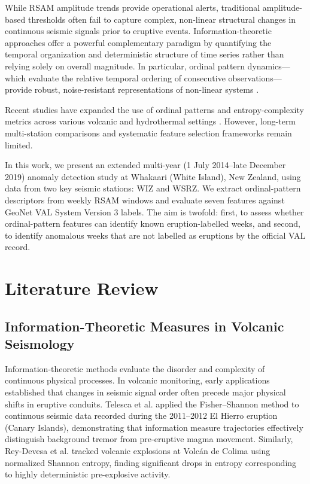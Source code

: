 \documentclass[journal]{IEEEtran}
\begin{document}
While RSAM amplitude trends provide operational alerts, traditional amplitude-based thresholds often fail to capture complex, non-linear structural changes in continuous seismic signals prior to eruptive events. Information-theoretic approaches offer a powerful complementary paradigm by quantifying the temporal organization and deterministic structure of time series rather than relying solely on overall magnitude. In particular, ordinal pattern dynamics—which evaluate the relative temporal ordering of consecutive observations—provide robust, noise-resistant representations of non-linear systems \cite{bandt2002permutation}.

Recent studies have expanded the use of ordinal patterns and entropy-complexity metrics across various volcanic and hydrothermal settings \cite{telesca2014using, rey2023tracking, sudibyo2022eruption}. However, long-term multi-station comparisons and systematic feature selection frameworks remain limited. 

In this work, we present an extended multi-year (1 July 2014--late December 2019) anomaly detection study at Whakaari (White Island), New Zealand, using data from two key seismic stations: WIZ and WSRZ. We extract ordinal-pattern descriptors from weekly RSAM windows and evaluate seven features against GeoNet VAL System Version 3 labels. The aim is twofold: first, to assess whether ordinal-pattern features can identify known eruption-labelled weeks, and second, to identify anomalous weeks that are not labelled as eruptions by the official VAL record.

\section{Literature Review}
\subsection{Information-Theoretic Measures in Volcanic Seismology}
Information-theoretic methods evaluate the disorder and complexity of continuous physical processes. In volcanic monitoring, early applications established that changes in seismic signal order often precede major physical shifts in eruptive conduits. Telesca et al. \cite{telesca2014using} applied the Fisher--Shannon method to continuous seismic data recorded during the 2011--2012 El Hierro eruption (Canary Islands), demonstrating that information measure trajectories effectively distinguish background tremor from pre-eruptive magma movement. Similarly, Rey-Devesa et al. \cite{rey2023tracking} tracked volcanic explosions at Volcán de Colima using normalized Shannon entropy, finding significant drops in entropy corresponding to highly deterministic pre-explosive activity.
\end{document}
